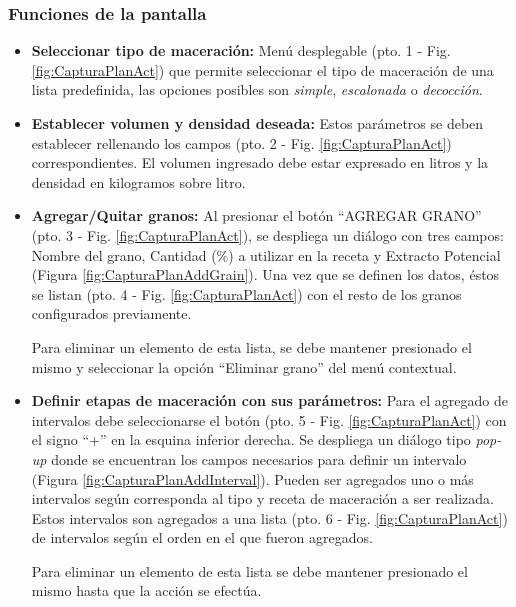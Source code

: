             \subsubsection{Funciones de la pantalla}
                \begin{itemize}
                    \item \textbf{Seleccionar tipo de maceración:} Menú desplegable (pto. 1 - Fig. \ref{fig:CapturaPlanAct}) que permite seleccionar el tipo de maceración de una lista predefinida, las opciones posibles son \textit{simple}, \textit{escalonada} o \textit{decocción}.
                    
                    \item \textbf{Establecer volumen y densidad deseada:} Estos parámetros se deben establecer rellenando los campos (pto. 2 - Fig. \ref{fig:CapturaPlanAct}) correspondientes. El volumen ingresado debe estar expresado en litros y la densidad en kilogramos sobre litro.
                    
                    \item \textbf{Agregar/Quitar granos:} Al presionar el botón ``AGREGAR GRANO'' (pto. 3 - Fig. \ref{fig:CapturaPlanAct}), se despliega un diálogo con tres campos: Nombre del grano, Cantidad (\%) a utilizar en la receta y Extracto Potencial (Figura \ref{fig:CapturaPlanAddGrain}). Una vez que se definen los datos, éstos se listan (pto. 4 - Fig. \ref{fig:CapturaPlanAct}) con el resto de los granos configurados previamente. %
                    
                        \par Para eliminar un elemento de esta lista, se debe mantener presionado el mismo y seleccionar la opción ``Eliminar grano'' del menú contextual.
                    
                    \item \textbf{Definir etapas de maceración con sus parámetros:} Para el agregado de intervalos debe seleccionarse el botón (pto. 5 - Fig. \ref{fig:CapturaPlanAct}) con el signo ``+'' en la esquina inferior derecha. Se despliega un diálogo tipo \textit{pop-up} donde se encuentran los campos necesarios para definir un intervalo (Figura \ref{fig:CapturaPlanAddInterval}). Pueden ser agregados uno o más intervalos según corresponda al tipo y receta de maceración a ser realizada. Estos intervalos son agregados a una lista (pto. 6 - Fig. \ref{fig:CapturaPlanAct}) de intervalos según el orden en el que fueron agregados.
                    \par Para eliminar un elemento de esta lista se debe mantener presionado el mismo hasta que la acción se efectúa.
                    

\end{itemize}
